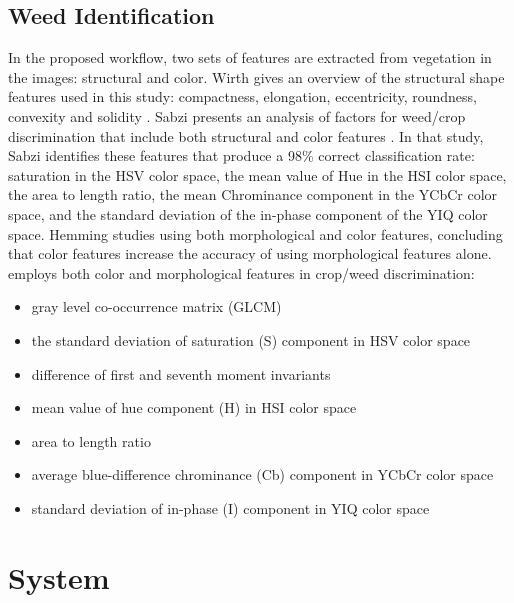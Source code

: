 \documentclass[12pt]{article}
\begin{document}
{%
\subsection{Weed Identification}
In the proposed workflow, two sets of features are extracted from vegetation in the images: structural and color. Wirth gives an overview of the structural shape features used in this study: compactness, elongation, eccentricity, roundness, convexity and solidity \cite{Wirth2004-li}. 
Sabzi presents an analysis of factors for weed/crop discrimination that include both structural and color features \cite{Sabzi2020-af}. In that study, Sabzi identifies these features that produce a 98\% correct classification rate: saturation in the HSV \cite{Various_undated-yv} color space, the mean value of Hue in the HSI color space, the area to length ratio, the mean Chrominance component in the YCbCr \cite{Wikipedia_contributors2022-qd} color space, and the standard deviation of the in-phase component of the YIQ \cite{Various_undated-cz} color space.
Hemming studies using both morphological and color features, concluding that color features increase the accuracy of using morphological features alone. \cite{Hemming2001-ue} \\

 \citeauthor{Sabzi2020-af} employs both color and morphological features in crop/weed discrimination\parencite{Sabzi2020-af}:
\begin{itemize}
	\item{gray level co-occurrence matrix (GLCM)}
	\item{the standard deviation of saturation (S) component in HSV color space}
	\item{difference of first and seventh moment invariants}
	\item{mean value of hue component (H) in HSI color space} 
	\item{area to length ratio}
	\item{average blue-difference chrominance (Cb) component in YCbCr color space}
	\item{standard deviation of in-phase (I) component in YIQ color space}
\end{itemize}


\newpage
 
\section{System}
\label{section:system}

}
\end{document}
